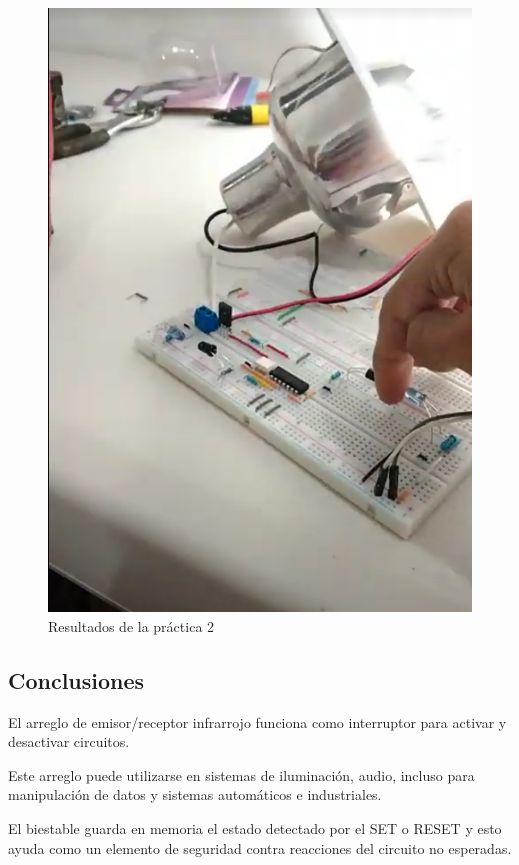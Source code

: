\begin{figure}[ht]
    \centering
    \includegraphics[scale=0.4]{media/Resultados2.png}
    \caption{Resultados de la práctica 2}
    \label{Fig: Resultados de la practica 2}
\end{figure}

\subsection{Conclusiones}

El arreglo de emisor/receptor infrarrojo funciona como interruptor para activar y desactivar circuitos.

Este arreglo puede utilizarse en sistemas de iluminación, audio, incluso para manipulación de datos y sistemas automáticos
e industriales.

El biestable guarda en memoria el estado detectado por el SET o RESET y esto ayuda como un elemento de seguridad contra
reacciones del circuito no esperadas.
